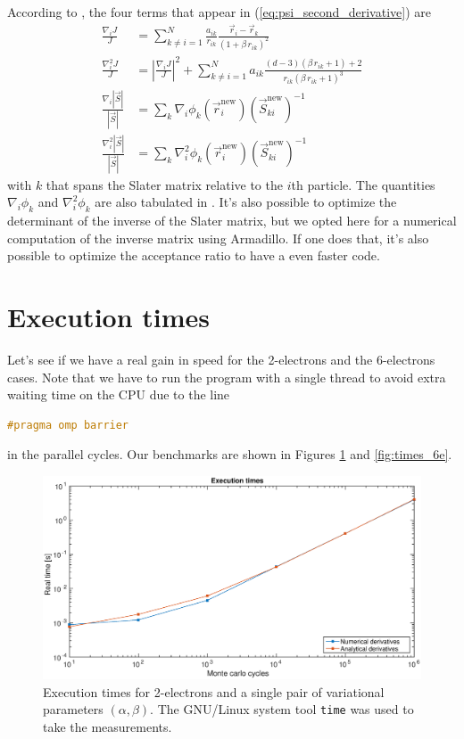 \documentclass[a4paper,twoside,11pt]{book}
\begin{document}
According to \cite{Hoegberget2013}, the four terms that appear in (\ref{eq:psi_second_derivative}) are
\begin{align}
	\frac{\nabla_i J}{J} 
	&= \sum_{k \neq i=1}^N \frac{a_{ik}}{r_{ik}} \frac{\vec{r}_i-\vec{r}_k}{(1+\beta \, r_{ik})^2} \\
	\frac{\nabla_i^2 J}{J} 
	&= \left|\frac{\nabla_i J}{J} \right|^2+ \sum_{k \neq i=1}^N a_{ik} \frac{(d-3)(\beta \, r_{ik}+1)+2}{r_{ik}(\beta \, r_{ik}+1)^3} \\
	\frac{\nabla_i |\vec{S}|}{|\vec{S}|} 
	&= \sum_k \nabla_i \phi_k (\vec{r}_i^{\text{new}})(\vec{S}_{ki}^{\text{new}})^{-1} \\
	\frac{\nabla_i^2 |\vec{S}|}{|\vec{S}|} 
	&= \sum_k \nabla_i^2 \phi_k (\vec{r}_i^{\text{new}})(\vec{S}_{ki}^{\text{new}})^{-1}
\end{align}
with $k$ that spans the Slater matrix relative to the $i$th particle. The quantities $\nabla_i \phi_k$ and $\nabla^2_i \phi_k$ are also tabulated in \cite{Hoegberget2013}. It's also possible to optimize the determinant of the inverse of the Slater matrix, but we opted here for a numerical computation of the inverse matrix using Armadillo. If one does that, it's also possible to optimize the acceptance ratio to have a even faster code.

\section{Execution times}

Let's see if we have a real gain in speed for the 2-electrons and the 6-electrons cases. Note that we have to run the program with a single thread to avoid extra waiting time on the CPU due to the line
\begin{lstlisting}[language=cpp]
		#pragma omp barrier
\end{lstlisting}
in the parallel cycles. Our benchmarks are shown in Figures \ref{fig:times_2e} and \ref{fig:times_6e}.

\begin{figure}[H]
	\centering
	\includegraphics[width=\textwidth]{times_2e}
	\caption{Execution times for 2-electrons and a single pair of variational parameters $(\alpha,\beta)$. The GNU/Linux system tool \texttt{time} was used to take the measurements.}
	\label{fig:times_2e}
\end{figure}
\end{document}
